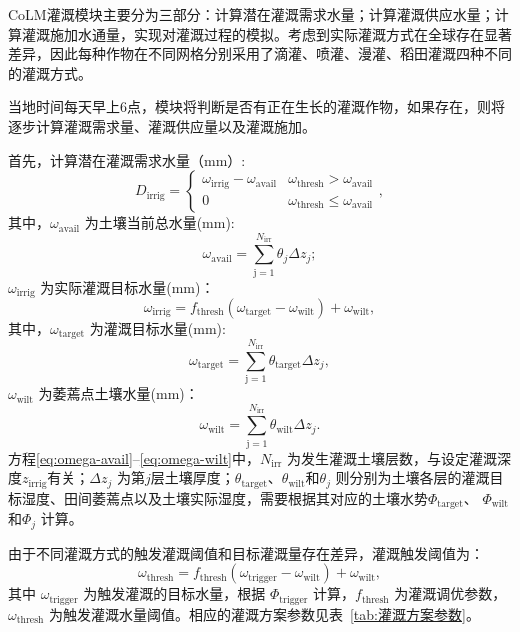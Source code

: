 CoLM灌溉模块主要分为三部分：计算潜在灌溉需求水量；计算灌溉供应水量；计算灌溉施加水通量，实现对灌溉过程的模拟。考虑到实际灌溉方式在全球存在显著差异，因此每种作物在不同网格分别采用了滴灌、喷灌、漫灌、稻田灌溉四种不同的灌溉方式。

当地时间每天早上6点，模块将判断是否有正在生长的灌溉作物，如果存在，则将逐步计算灌溉需求量、灌溉供应量以及灌溉施加。

首先，计算潜在灌溉需求水量（mm）:
\begin{equation}
  D_{\mathrm{irrig}} = \begin{cases}
    \omega_{\mathrm{irrig}} - \omega_{\mathrm{avail}} & \omega_{\mathrm{thresh}} > \omega_{\mathrm{avail}} \\
    0     & \omega_{\mathrm{thresh}} \leqslant \omega_{\mathrm{avail}}
  \end{cases},
\end{equation}
其中，$\omega_{\mathrm{avail}}$ 为土壤当前总水量(mm):
\begin{equation}\label{eq:omega-avail}
  \omega_{\mathrm{avail}} = \sum_{\mathrm{j=1}}^{N_{\mathrm{irr}}}\theta_j\Delta z_j;
\end{equation}
$\omega_{\mathrm{irrig}}$ 为实际灌溉目标水量(mm)：
\begin{equation}
  \omega_{\mathrm{irrig}} = f_{\mathrm{thresh}}(\omega_{\mathrm{target}}-\omega_{\mathrm{wilt}}) + \omega_{\mathrm{wilt}},
\end{equation}
其中，$\omega_{\mathrm{target}}$ 为灌溉目标水量(mm):
\begin{equation}
  \omega_{\mathrm{target}} = \sum_{\mathrm{j=1}}^{N_{\mathrm{irr}}}\theta_{\mathrm{target}}\Delta z_j,
\end{equation}
$\omega_{\mathrm{wilt}}$ 为萎蔫点土壤水量(mm)：
\begin{equation}\label{eq:omega-wilt}
  \omega_{\mathrm{wilt}} = \sum_{\mathrm{j=1}}^{N_{\mathrm{irr}}}\theta_{\mathrm{wilt}}\Delta z_j.
\end{equation}
方程\eqref{eq:omega-avail}--\eqref{eq:omega-wilt}中，$N_{\mathrm{irr}}$ 为发生灌溉土壤层数，与设定灌溉深度$z_{\mathrm{irrig}}$有关；$\Delta z_j$ 为第$j$层土壤厚度；$\theta_{\mathrm{target}}$、$\theta_{\mathrm{wilt}}$和$\theta_j$ 则分别为土壤各层的灌溉目标湿度、田间萎蔫点以及土壤实际湿度，需要根据其对应的土壤水势$\Phi_{\mathrm{target}}$、 $\Phi_{\mathrm{wilt}}$和$\Phi_j$ 计算。

由于不同灌溉方式的触发灌溉阈值和目标灌溉量存在差异，灌溉触发阈值为：
\begin{equation}
  \omega_{\mathrm{thresh}} = f_{\mathrm{thresh}}(\omega_{\mathrm{trigger}}-\omega_{\mathrm{wilt}}) + \omega_{\mathrm{wilt}},
\end{equation}
其中 $\omega_{\mathrm{trigger}}$ 为触发灌溉的目标水量，根据 $\Phi_{\mathrm{trigger}}$ 计算，$f_{\mathrm{thresh}}$ 为灌溉调优参数，$\omega_{\mathrm{thresh}}$ 为触发灌溉水量阈值。相应的灌溉方案参数见表~\ref{tab:灌溉方案参数}。

